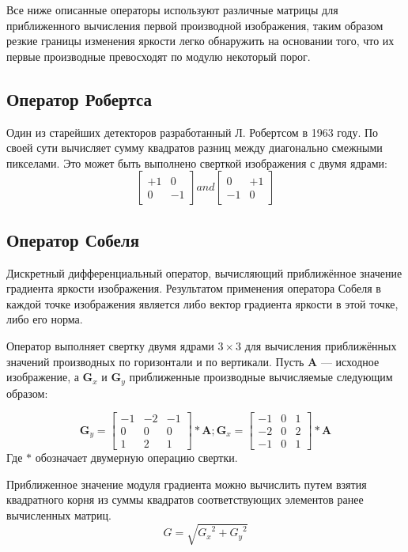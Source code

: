 Все ниже описанные операторы используют различные матрицы для приближенного вычисления первой производной изображения, таким образом резкие границы изменения яркости легко обнаружить на основании того, что их первые производные превосходят по модулю некоторый порог.
\subsection{Оператор Робертса}
Один из старейших детекторов разработанный Л. Робертсом в 1963 году\cite{RobertsPhD}. По своей сути вычисляет сумму квадратов разниц между диагонально смежными пикселами. Это может быть выполнено сверткой изображения с двумя ядрами:
$$ 
\begin{bmatrix}
+1 & 0\\
0 & -1
\end{bmatrix}
and
\begin{bmatrix}
0 & +1\\
-1 & 0
\end{bmatrix}
$$
\subsection{Оператор Собеля}
Дискретный дифференциальный оператор, вычисляющий приближённое значение градиента яркости изображения. Результатом применения оператора Собеля в каждой точке изображения является либо вектор градиента яркости в этой точке, либо его норма. 

Оператор выполняет свертку двумя ядрами $3 \times 3$ для вычисления приближённых значений производных по горизонтали и по вертикали. Пусть $\mathbf{A}$ --- исходное изображение, а $\mathbf{G}_x$ и $\mathbf{G}_y$ приближенные производные вычисляемые следующим образом:

$$ 
\mathbf{G}_y =
\begin{bmatrix}
    -1 & -2 & -1\\
    0 & 0 & 0 \\
    1 & 2 & 1    
\end{bmatrix}
\ast \mathbf{A}
;
\mathbf{G}_x =
\begin{bmatrix}
    -1 & 0 & 1\\
    -2 & 0 & 2 \\
    -1 & 0 & 1 
\end{bmatrix}
\ast \mathbf{A}
$$
Где $\ast$ обозначает двумерную операцию свертки.

Приближенное значение модуля градиента можно вычислить путем взятия квадратного корня из суммы квадратов соответствующих элементов ранее вычисленных матриц.
$$
G = \sqrt{{G_x}^2 + {G_y}^2}
$$

